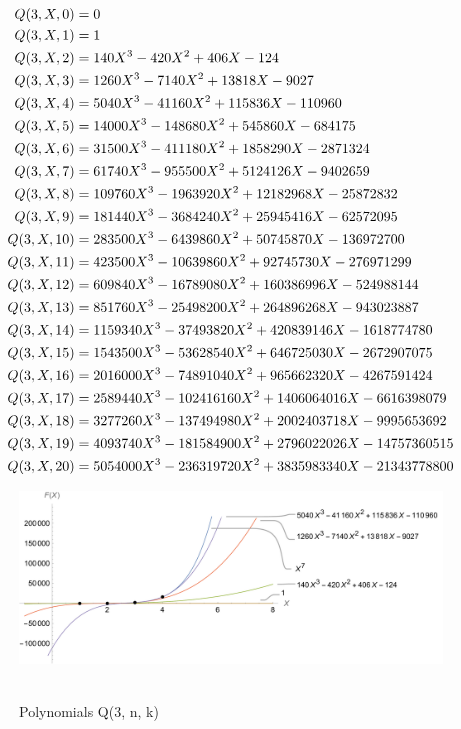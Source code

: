 ﻿\begin{align*}
    {Q}(3,X,0) &= 0 \\
    {Q}(3,X,1) &= 1 \\
    {Q}(3,X,2) &= 140X^3 - 420X^2 + 406X - 124 \\
    {Q}(3,X,3) &= 1260X^3 - 7140X^2 + 13818X - 9027 \\
    {Q}(3,X,4) &= 5040X^3 - 41160X^2 + 115836X - 110960 \\
    {Q}(3,X,5) &= 14000X^3 - 148680X^2 + 545860X - 684175 \\
    {Q}(3,X,6) &= 31500X^3 - 411180X^2 + 1858290X - 2871324 \\
    {Q}(3,X,7) &= 61740X^3 - 955500X^2 + 5124126X - 9402659 \\
    {Q}(3,X,8) &= 109760X^3 - 1963920X^2 + 12182968X - 25872832 \\
    {Q}(3,X,9) &= 181440X^3 - 3684240X^2 + 25945416X - 62572095 \\
    {Q}(3,X,10) &= 283500X^3 - 6439860X^2 + 50745870X - 136972700 \\
    {Q}(3,X,11) &= 423500X^3 - 10639860X^2 + 92745730X - 276971299 \\
    {Q}(3,X,12) &= 609840X^3 - 16789080X^2 + 160386996X - 524988144 \\
    {Q}(3,X,13) &= 851760X^3 - 25498200X^2 + 264896268X - 943023887 \\
    {Q}(3,X,14) &= 1159340X^3 - 37493820X^2 + 420839146X - 1618774780 \\
    {Q}(3,X,15) &= 1543500X^3 - 53628540X^2 + 646725030X - 2672907075 \\
    {Q}(3,X,16) &= 2016000X^3 - 74891040X^2 + 965662320X - 4267591424 \\
    {Q}(3,X,17) &= 2589440X^3 - 102416160X^2 + 1406064016X - 6616398079 \\
    {Q}(3,X,18) &= 3277260X^3 - 137494980X^2 + 2002403718X - 9995653692 \\
    {Q}(3,X,19) &= 4093740X^3 - 181584900X^2 + 2796022026X - 14757360515 \\
    {Q}(3,X,20) &= 5054000X^3 - 236319720X^2 + 3835983340X - 21343778800
\end{align*}
\begin{figure}[H]
    \centering
    \includegraphics[width=1\textwidth]{sections/images/06_plots_seventh_with_q_3}
    ~\caption{Polynomials Q(3, n, k)}\label{fig:figure6}
\end{figure}
